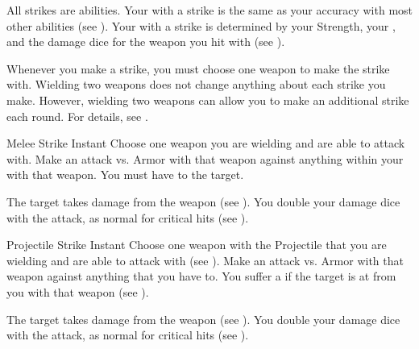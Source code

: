         All strikes are  abilities.
        Your  with a strike is the same as your accuracy with most other abilities (see ).
        Your  with a strike is determined by your Strength, your , and the damage dice for the weapon you hit with (see ).

        Whenever you make a strike, you must choose one weapon to make the strike with.
        Wielding two weapons does not change anything about each strike you make.
        However, wielding two weapons can allow you to make an additional strike each round.
        For details, see .

        \begin{instantability}{Melee Strike}
            \label{Melee Strike}
            Instant
            \rankline
            Choose one weapon you are wielding and are able to attack with.
            Make an attack vs. Armor with that weapon against anything within your  with that weapon.
            You must have  to the target.

            \hit The target takes damage from the weapon (see ).
            \crit You double your damage dice with the attack, as normal for critical hits (see ).
        \end{instantability}

        \begin{instantability}{Projectile Strike}
            \label{Projectile Strike}
            Instant
            \rankline
            Choose one weapon with the Projectile  that you are wielding and are able to attack with (see ).
            Make an attack vs. Armor with that weapon against anything that you have  to.
            You suffer a  if the target is at  from you with that weapon (see ).

            \hit The target takes damage from the weapon (see ).
            \crit You double your damage dice with the attack, as normal for critical hits (see ).
        \end{instantability}

